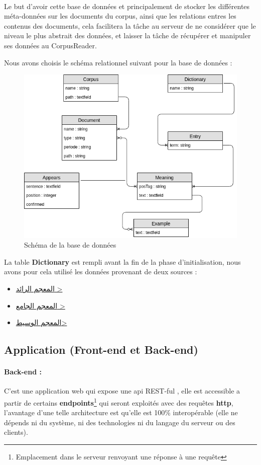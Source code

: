 \documentclass[]{report}
\begin{document}
			\paragraph{}
			Le but d'avoir cette base de données et principalement de stocker les différentes méta-données sur les documents du corpus, ainsi que les relations entres les contenus des documents, cela facilitera la tâche au serveur de ne considérer que le niveau le plus abstrait des données, et laisser la tâche de récupérer et manipuler ses données au CorpusReader.
			\par 
			Nous avons choisis le schéma relationnel suivant pour la base de données : 
			
			\begin{figure}[H]
				\centering
				\includegraphics[width=0.65\linewidth]{images/db_schema.png}
				\caption{Schéma de la base de données }
			\end{figure}
		
			\par
			La table \textbf{Dictionary} est rempli avant la fin de la phase d'initialisation, nous avons pour cela utilisé les données provenant de deux sources : 
			\begin{itemize}
				\item \href{http://waqfeya.com/book.php?bid=6116}{\<المعجم الرائد >}
				\item \href{https://www.almaany.com/ar/dict/ar-ar/}{\<المعجم الجامع >}
				\item \href{http://waqfeya.com/book.php?bid=210}{\<المعجم الوسيط> }
			\end{itemize}
			
		\subsection{Application (Front-end et Back-end)}	
			\paragraph{Back-end :}
			C'est une application web qui expose une api REST-ful , elle est accessible a partir de certains \textbf{endpoints}\footnote{Emplacement dans le serveur renvoyant une réponse à une requête } qui seront exploités avec
			des requêtes \textbf{http}, l'avantage d'une telle architecture est qu'elle est 100\% interopérable 
			(elle ne dépends ni du système, ni des technologies ni du langage du serveur ou des clients).
\end{document}
